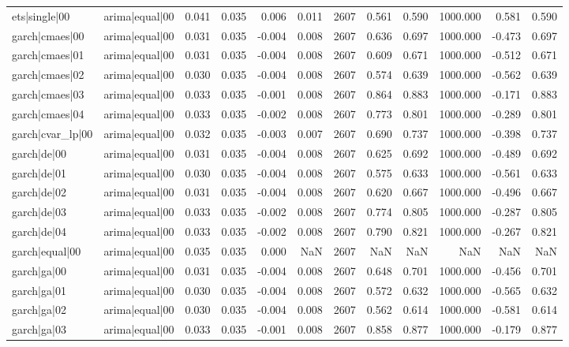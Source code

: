 \begin{table}
\begin{tabular}{llrrrrrrrrrr}
ets|single|00 & arima|equal|00 & 0.041 & 0.035 & 0.006 & 0.011 & 2607 & 0.561 & 0.590 & 1000.000 & 0.581 & 0.590 \\
garch|cmaes|00 & arima|equal|00 & 0.031 & 0.035 & -0.004 & 0.008 & 2607 & 0.636 & 0.697 & 1000.000 & -0.473 & 0.697 \\
garch|cmaes|01 & arima|equal|00 & 0.031 & 0.035 & -0.004 & 0.008 & 2607 & 0.609 & 0.671 & 1000.000 & -0.512 & 0.671 \\
garch|cmaes|02 & arima|equal|00 & 0.030 & 0.035 & -0.004 & 0.008 & 2607 & 0.574 & 0.639 & 1000.000 & -0.562 & 0.639 \\
garch|cmaes|03 & arima|equal|00 & 0.033 & 0.035 & -0.001 & 0.008 & 2607 & 0.864 & 0.883 & 1000.000 & -0.171 & 0.883 \\
garch|cmaes|04 & arima|equal|00 & 0.033 & 0.035 & -0.002 & 0.008 & 2607 & 0.773 & 0.801 & 1000.000 & -0.289 & 0.801 \\
garch|cvar\_lp|00 & arima|equal|00 & 0.032 & 0.035 & -0.003 & 0.007 & 2607 & 0.690 & 0.737 & 1000.000 & -0.398 & 0.737 \\
garch|de|00 & arima|equal|00 & 0.031 & 0.035 & -0.004 & 0.008 & 2607 & 0.625 & 0.692 & 1000.000 & -0.489 & 0.692 \\
garch|de|01 & arima|equal|00 & 0.030 & 0.035 & -0.004 & 0.008 & 2607 & 0.575 & 0.633 & 1000.000 & -0.561 & 0.633 \\
garch|de|02 & arima|equal|00 & 0.031 & 0.035 & -0.004 & 0.008 & 2607 & 0.620 & 0.667 & 1000.000 & -0.496 & 0.667 \\
garch|de|03 & arima|equal|00 & 0.033 & 0.035 & -0.002 & 0.008 & 2607 & 0.774 & 0.805 & 1000.000 & -0.287 & 0.805 \\
garch|de|04 & arima|equal|00 & 0.033 & 0.035 & -0.002 & 0.008 & 2607 & 0.790 & 0.821 & 1000.000 & -0.267 & 0.821 \\
garch|equal|00 & arima|equal|00 & 0.035 & 0.035 & 0.000 & NaN & 2607 & NaN & NaN & NaN & NaN & NaN \\
garch|ga|00 & arima|equal|00 & 0.031 & 0.035 & -0.004 & 0.008 & 2607 & 0.648 & 0.701 & 1000.000 & -0.456 & 0.701 \\
garch|ga|01 & arima|equal|00 & 0.030 & 0.035 & -0.004 & 0.008 & 2607 & 0.572 & 0.632 & 1000.000 & -0.565 & 0.632 \\
garch|ga|02 & arima|equal|00 & 0.030 & 0.035 & -0.004 & 0.008 & 2607 & 0.562 & 0.614 & 1000.000 & -0.581 & 0.614 \\
garch|ga|03 & arima|equal|00 & 0.033 & 0.035 & -0.001 & 0.008 & 2607 & 0.858 & 0.877 & 1000.000 & -0.179 & 0.877 \\

\end{tabular}
\end{table}
